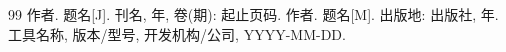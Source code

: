 
\begin{thebibliography}{99}
 作者. 题名[J]. 刊名, 年, 卷(期): 起止页码.
 作者. 题名[M]. 出版地: 出版社, 年.
 工具名称, 版本/型号, 开发机构/公司, YYYY-MM-DD.
\end{thebibliography}
